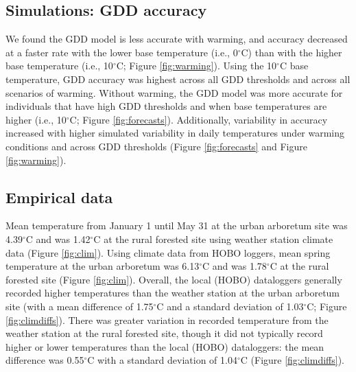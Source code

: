 \documentclass{article}\usepackage[]{graphicx}\usepackage[]{color}
\begin{document}
\subsection*{Simulations: GDD accuracy}
We found the GDD model is less accurate with warming, and accuracy decreased at a faster rate with the lower base temperature (i.e., 0$^{\circ}$C) than with the higher base temperature (i.e., 10$^{\circ}$C; Figure \ref{fig:warming}). Using the 10$^{\circ}$C base temperature, GDD accuracy was highest across all GDD thresholds and across all scenarios of warming. Without warming, the GDD model was more accurate for individuals that have high GDD thresholds and when base temperatures are higher (i.e., 10$^{\circ}$C; Figure \ref{fig:forecasts}). Additionally, variability in accuracy increased with higher simulated variability in daily temperatures under warming conditions and across GDD thresholds (Figure \ref{fig:forecasts} and Figure \ref{fig:warming}).

\subsection*{Empirical data} 

Mean temperature from January 1 until May 31 at the urban arboretum site was 4.39$^{\circ}$C and was 1.42$^{\circ}$C at the rural forested site using weather station climate data (Figure \ref{fig:clim}). Using climate data from HOBO loggers, mean spring temperature at the urban arboretum was 6.13$^{\circ}$C and was 1.78$^{\circ}$C at the rural forested site (Figure \ref{fig:clim}). Overall, the local (HOBO) dataloggers generally recorded higher temperatures than the weather station at the urban arboretum site (with a mean difference of 1.75$^{\circ}$C and a standard deviation of 1.03$^{\circ}$C; Figure \ref{fig:climdiffs}). There was greater variation in recorded temperature from the weather station at the rural forested site, though it did not typically record higher or lower temperatures than the local (HOBO) dataloggers: the mean difference was 0.55$^{\circ}$C with a standard deviation of 1.04$^{\circ}$C (Figure \ref{fig:climdiffs}). 
\end{document}
